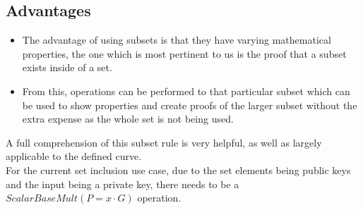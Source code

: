\documentclass{article}
\begin{document}
\subsection{Advantages}
\begin{itemize}
    \item The advantage of using subsets is that they have varying mathematical properties, the one which is most pertinent to us is the proof that a subset exists inside of a set.
    \item From this, operations can be performed to that particular subset which can be used to show properties and create proofs of the larger subset without the extra expense as the whole set is not being used.
\end{itemize}
A full comprehension of this subset rule is very helpful, as well as largely applicable to the defined curve. \\
For the current set inclusion use case, due to the set elements being public keys and the input being a private key, there needs to be a $ScalarBaseMult (P=x\cdot G)$ operation.
\end{document}
